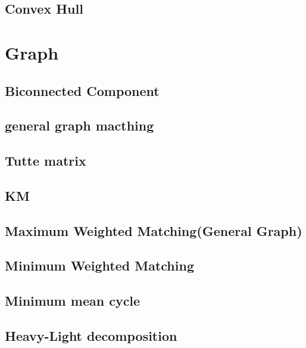 \documentclass[a4paper,10pt,twocolumn,oneside]{article}
\begin{document}
\subsection{Convex Hull}


\section{Graph}
\subsection{Biconnected Component}


\subsection{general graph macthing}


\subsection{Tutte matrix}


\subsection{KM}


\subsection{Maximum Weighted Matching(General Graph)}


\subsection{Minimum Weighted Matching}


\subsection{Minimum mean cycle}


\subsection{Heavy-Light decomposition}

\end{document}
